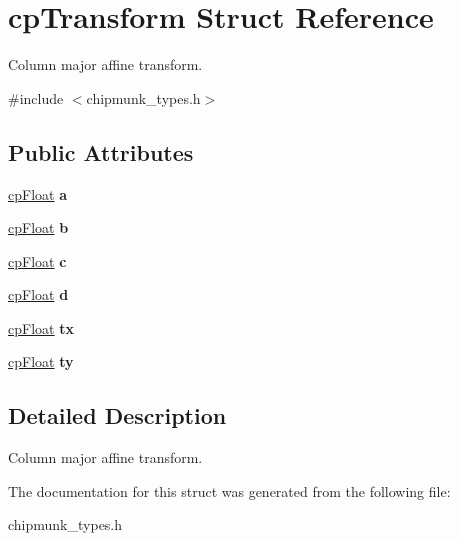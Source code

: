 \hypertarget{structcp_transform}{}\section{cp\+Transform Struct Reference}
\label{structcp_transform}


Column major affine transform.  




{\ttfamily \#include $<$chipmunk\+\_\+types.\+h$>$}

\subsection*{Public Attributes}
\begin{DoxyCompactItemize}
\item 
\hypertarget{structcp_transform_a99065fbbead0a1df742987d5236f9fa0}{}\hyperlink{group__basic_types_gac1ed65573e035bf892505768c852d8d3}{cp\+Float} {\bfseries a}\label{structcp_transform_a99065fbbead0a1df742987d5236f9fa0}

\item 
\hypertarget{structcp_transform_a86126f0cf307529a7faab06f7356a698}{}\hyperlink{group__basic_types_gac1ed65573e035bf892505768c852d8d3}{cp\+Float} {\bfseries b}\label{structcp_transform_a86126f0cf307529a7faab06f7356a698}

\item 
\hypertarget{structcp_transform_ab0da955529cd2c48fe0aca3d4ff239a7}{}\hyperlink{group__basic_types_gac1ed65573e035bf892505768c852d8d3}{cp\+Float} {\bfseries c}\label{structcp_transform_ab0da955529cd2c48fe0aca3d4ff239a7}

\item 
\hypertarget{structcp_transform_a9ad9383b2b2d39d419cb9434f3d761b2}{}\hyperlink{group__basic_types_gac1ed65573e035bf892505768c852d8d3}{cp\+Float} {\bfseries d}\label{structcp_transform_a9ad9383b2b2d39d419cb9434f3d761b2}

\item 
\hypertarget{structcp_transform_ab96aaff15cc6eee33ebc02a9008e364d}{}\hyperlink{group__basic_types_gac1ed65573e035bf892505768c852d8d3}{cp\+Float} {\bfseries tx}\label{structcp_transform_ab96aaff15cc6eee33ebc02a9008e364d}

\item 
\hypertarget{structcp_transform_a19248d1cb0123595538815db45ce81b1}{}\hyperlink{group__basic_types_gac1ed65573e035bf892505768c852d8d3}{cp\+Float} {\bfseries ty}\label{structcp_transform_a19248d1cb0123595538815db45ce81b1}

\end{DoxyCompactItemize}


\subsection{Detailed Description}
Column major affine transform. 

The documentation for this struct was generated from the following file\+:\begin{DoxyCompactItemize}
\item 
chipmunk\+\_\+types.\+h\end{DoxyCompactItemize}
